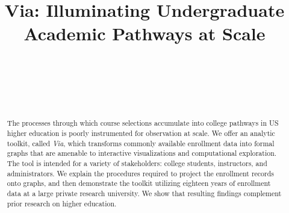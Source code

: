 \documentclass{sigchi}
\def\plaintitle{Via: Illuminating Undergraduate Academic Pathways at Scale}
\begin{document}
\title{\plaintitle}

\author{%
  \\
  \\
  \\
  \\
}

\maketitle

\begin{abstract}
The processes through which course selections accumulate into college
pathways in US higher education is poorly instrumented for observation
at scale. We offer an analytic toolkit, called {\em Via}, which
transforms commonly available enrollment data into formal graphs that
are amenable to interactive visualizations and computational
exploration. The tool is intended for a variety of stakeholders:
college students, instructors, and administrators. We explain the
procedures required to project the enrollment records onto graphs, and
then demonstrate the toolkit utilizing eighteen years of enrollment
data at a large private research university. We show that resulting
findings complement prior research on higher education.
 \end{abstract}















\balance{}

{\small}
\end{document}
